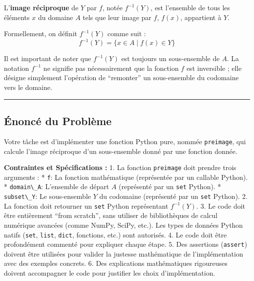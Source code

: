 \documentclass[12pt,a4paper]{report}
\newcommand{\passthrough}[1]{#1}
\begin{document}
L'\textbf{image réciproque} de \(Y\) par \(f\), notée \(f^{-1}(Y)\), est
l'ensemble de tous les éléments \(x\) du domaine \(A\) tels que leur
image par \(f\), \(f(x)\), appartient à \(Y\).

Formellement, on définit \(f^{-1}(Y)\) comme suit :
\[ f^{-1}(Y) = \{x \in A \mid f(x) \in Y\} \]

Il est important de noter que \(f^{-1}(Y)\) est toujours un
sous-ensemble de \(A\). La notation \(f^{-1}\) ne signifie pas
nécessairement que la fonction \(f\) est inversible ; elle désigne
simplement l'opération de ``remonter'' un sous-ensemble du codomaine
vers le domaine.

\begin{center}\rule{0.5\linewidth}{0.5pt}\end{center}

\subsection{Énoncé du Problème}\label{uxe9noncuxe9-du-probluxe8me}

Votre tâche est d'implémenter une fonction Python pure, nommée
\passthrough{\lstinline!preimage!}, qui calcule l'image réciproque d'un
sous-ensemble donné par une fonction donnée.

\textbf{Contraintes et Spécifications :} 1. La fonction
\passthrough{\lstinline!preimage!} doit prendre trois arguments : *
\passthrough{\lstinline!f!}: La fonction mathématique (représentée par
un callable Python). * \passthrough{\lstinline!domain\_A!}: L'ensemble
de départ \(A\) (représenté par un \passthrough{\lstinline!set!}
Python). * \passthrough{\lstinline!subset\_Y!}: Le sous-ensemble \(Y\)
du codomaine (représenté par un \passthrough{\lstinline!set!} Python).
2. La fonction doit retourner un \passthrough{\lstinline!set!} Python
représentant \(f^{-1}(Y)\). 3. Le code doit être entièrement ``from
scratch'', sans utiliser de bibliothèques de calcul numérique avancées
(comme NumPy, SciPy, etc.). Les types de données Python natifs
(\passthrough{\lstinline!set!}, \passthrough{\lstinline!list!},
\passthrough{\lstinline!dict!}, fonctions, etc.) sont autorisés. 4. Le
code doit être profondément commenté pour expliquer chaque étape. 5. Des
assertions (\passthrough{\lstinline!assert!}) doivent être utilisées
pour valider la justesse mathématique de l'implémentation avec des
exemples concrets. 6. Des explications mathématiques rigoureuses doivent
accompagner le code pour justifier les choix d'implémentation.
\end{document}
